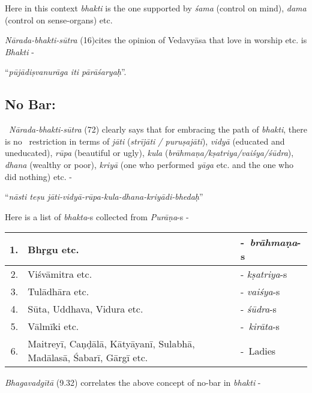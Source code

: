 Here in this context \textit{bhakti} is the one supported by \textit{śama} (control on mind), \textit{dama} (control on sense-organs) etc.

\textit{Nārada-bhakti-sūtra} (16)cites the opinion of Vedavyāsa that love in worship etc. is \textit{Bhakti} -

\begin{myquote}
“\textit{pūjādiṣvanurāga iti pārāśaryaḥ}”.
\end{myquote}


\subsection*{No Bar:}

 \textit{Nārada-bhakti-sūtra} (72) clearly says that for embracing the path of \textit{bhakti}, there is no  restriction in terms of \textit{jāti} (\textit{strījāti / puruṣajāti}), \textit{vidyā} (educated and uneducated), \textit{rūpa} (beautiful or ugly), \textit{kula} (\textit{brāhmaṇa/kṣatriya/vaiśya/śūdra}), \textit{dhana} (wealthy or poor), \textit{kriyā} (one who performed \textit{yāga} etc. and the one who did nothing) etc. -

\begin{myquote}
“\textit{nāsti teṣu jāti-vidyā-rūpa-kula-dhana-kriyādi-bhedaḥ}”
\end{myquote}

Here is a list of \textit{bhakta}-s collected from \textit{Purāṇa}-s -

\begin{longtable}{|r|p{6cm}|l|}
\hline
1. & Bhṛgu etc. & - \textit{brāhmaṇa}-s \\
\hline
2. & Viśvāmitra etc. & - \textit{kṣatriya}-s \\
\hline
3. & Tulādhāra etc. & - \textit{vaiśya}-s \\
\hline
4. & Sūta, Uddhava, Vidura etc. & - \textit{śūdra}-s \\
\hline
5. & Vālmīki etc. & - \textit{kirāta}-s \\
\hline
6. & Maitreyī, Caṇḍālā, Kātyāyanī, Sulabhā, Madālasā, Śabarī, Gārgī etc. & - Ladies \\
\hline
\end{longtable}

\textit{Bhagavadgītā} (9.32) correlates the above concept of no-bar in \textit{bhakti} -

